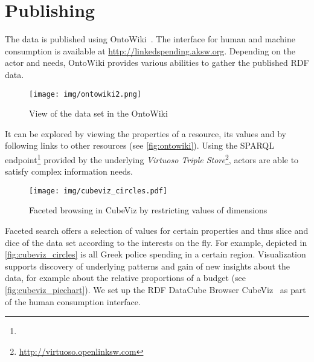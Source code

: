\documentclass[sw]{iosart2x}
\begin{document}
\section{Publishing}\label{sec:publishing}
The data is published using OntoWiki~\cite{ontowiki_www}.
The interface for human and machine consumption is available at \url{http://linkedspending.aksw.org}.
Depending on the actor and needs, OntoWiki provides various abilities to gather the published RDF data.
\begin{figure}[b!]
\texttt{[image: img/ontowiki2.png]}
\caption{View of the data set  in the OntoWiki}
\label{fig:ontowiki}
\end{figure}
It can be explored by viewing the properties of a resource, its values and by following links to other resources (see \autoref{fig:ontowiki}).
Using the SPARQL endpoint\footnote{\sparql} provided by the underlying \emph{Virtuoso Triple Store}\footnote{\url{http://virtuoso.openlinksw.com}}, actors are able to satisfy complex information needs.
\begin{figure}[t!]
\texttt{[image: img/cubeviz\_circles.pdf]}
\caption{Faceted browsing in CubeViz by restricting values of dimensions}
\label{fig:cubeviz_circles}
\end{figure}

Faceted search offers a selection of values for certain properties and thus slice and dice of the data set according to the interests on the fly.
For example, depicted in \autoref{fig:cubeviz_circles} is all Greek police spending in a certain region.
Visualization supports discovery of underlying patterns and gain of new insights about the data, for example about the relative proportions of a budget (see \autoref{fig:cubeviz_piechart}).
We set up the RDF DataCube Browser CubeViz~\cite{salas-ijsc-2013} as part of the human consumption interface.
\end{document}
